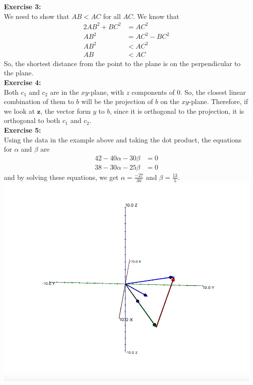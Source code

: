 \documentclass[10pt]{article}
\begin{document}
	\textbf{\large Exercise 3:}\\
	We need to show that $AB < AC$ for all $AC$. We know that 
	\begin{alignat*}{2}
		AB^2 + BC^2 &= AC^2\\
		AB^2 &= AC^2 - BC^2\\
		AB^2 &< AC^2\\
		AB &< AC
	\end{alignat*}
	So, the shortest distance from the point to the plane is on the perpendicular to the plane.
	\\
	
	\textbf{\large Exercise 4:}\\
	Both $c_1$ and $c_2$ are in the $xy$-plane, with $z$ components of 0. So, the closest linear combination of them to $b$ will be the projection of $b$ on the $xy$-plane. Therefore, if we look at $\textbf{z}$, the vector form $y$ to $b$, since it is orthogonal to the projection, it is orthogonal to both $c_1$ and $c_2$.
	\\
	
	\textbf{\large Exercise 5:}\\
	Using the data in the example above and taking the dot product, the equations for $\alpha$ and $\beta$ are
	$$\begin{array}{lllllll}
	42 - 40\alpha - 30\beta &= 0\\
	38 - 30\alpha -25\beta &= 0
	\end{array}$$
	and by solving these equations, we get $\alpha = \frac{-27}{30}$ and $\beta = \frac{13}{5}$. \\
	\includegraphics[scale=0.2]{module7_exercise5}
	\\
	
\end{document}
